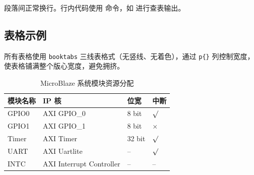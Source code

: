 \documentclass[a4paper,12pt]{article}
\begin{document}
段落间正常换行。行内代码使用  命令，如  进行查表输出。

\subsection{表格示例}

所有表格使用 \texttt{booktabs} 三线表格式（无竖线、无着色），通过 \texttt{p\{\}} 列控制宽度，使表格铺满整个版心宽度，避免拥挤。

\begin{table}[htbp]
    \centering
    \caption{MicroBlaze 系统模块资源分配}
    \label{tab:module-resource}
    \small
    \renewcommand{\arraystretch}{1.25}
    \begin{tabular}{@{}p{3.5cm} p{5.5cm} p{2cm} p{2cm}@{}}
        \toprule
        \bfseries 模块名称 & \bfseries IP 核          & \bfseries 位宽  & \bfseries 中断 \\\midrule
        GPIO0              & AXI GPIO\_0             & 8 bit  & $\surd$ \\
        GPIO1              & AXI GPIO\_1             & 8 bit  & $\times$ \\
        Timer              & AXI Timer               & 32 bit & $\surd$ \\
        UART               & AXI Uartlite            & --     & $\surd$ \\
        INTC               & AXI Interrupt Controller& --     & -- \\\bottomrule
    \end{tabular}
\end{table}
\end{document}
